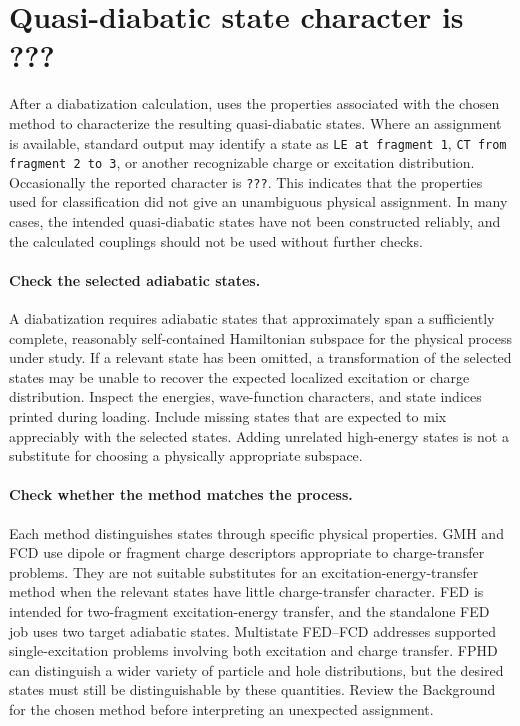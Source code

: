 \section{Quasi-diabatic state character is ???}\label{sec-trouble-unphysical}
After a diabatization calculation, \progname{} uses the properties associated with the chosen method to characterize the resulting quasi-diabatic states. Where an assignment is available, standard output may identify a state as \texttt{LE at fragment 1}, \texttt{CT from fragment 2 to 3}, or another recognizable charge or excitation distribution. Occasionally the reported character is \texttt{???}. This indicates that the properties used for classification did not give an unambiguous physical assignment. In many cases, the intended quasi-diabatic states have not been constructed reliably, and the calculated couplings should not be used without further checks.

\paragraph{Check the selected adiabatic states.}
A diabatization requires adiabatic states that approximately span a sufficiently complete, reasonably self-contained Hamiltonian subspace for the physical process under study. If a relevant state has been omitted, a transformation of the selected states may be unable to recover the expected localized excitation or charge distribution. Inspect the energies, wave-function characters, and state indices printed during loading. Include missing states that are expected to mix appreciably with the selected states. Adding unrelated high-energy states is not a substitute for choosing a physically appropriate subspace.

\paragraph{Check whether the method matches the process.}
Each method distinguishes states through specific physical properties. GMH and FCD use dipole or fragment charge descriptors appropriate to charge-transfer problems. They are not suitable substitutes for an excitation-energy-transfer method when the relevant states have little charge-transfer character. FED is intended for two-fragment excitation-energy transfer, and the standalone FED job uses two target adiabatic states. Multistate FED--FCD addresses supported single-excitation problems involving both excitation and charge transfer. FPHD can distinguish a wider variety of particle and hole distributions, but the desired states must still be distinguishable by these quantities. Review the Background for the chosen method before interpreting an unexpected assignment.


